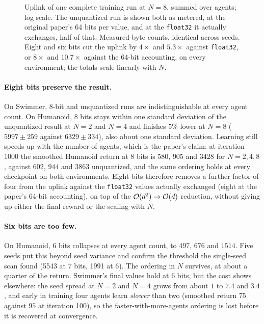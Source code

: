 \begin{figure}[tbp]
  \centering
  
  \caption{Uplink of one complete training run at $N=8$, summed over agents;
  log scale. The unquantized run is shown both as metered, at the original paper's 64
  bits per value, and at the \texttt{float32} it actually exchanges, half of
  that. Measured byte counts, identical across seeds. Eight and six bits cut
  the uplink by $4\times$ and $5.3\times$ against \texttt{float32}, or $8\times$
  and $10.7\times$ against the 64-bit accounting, on every environment; the
  totals scale linearly with $N$.}
  \label{fig:quantoverhead}
\end{figure}

\paragraph{Eight bits preserve the result.} On Swimmer, 8-bit and unquantized
runs are indistinguishable at every agent count. On Humanoid, 8 bits stays
within one standard deviation of the unquantized result at $N=2$ and $N=4$
and finishes $5\%$ lower at $N=8$ ($5997 \pm 259$ against $6329 \pm 334$),
also about one standard deviation. Learning still speeds up with the number of
agents, which is the paper's claim: at iteration 1000 the
smoothed Humanoid return at 8 bits is $580$, $905$ and $3428$ for $N = 2, 4,
8$, against $602$, $944$ and $3863$ unquantized, and the same ordering holds at
every checkpoint on both environments. Eight bits therefore removes a further
factor of four from the uplink against the \texttt{float32} values actually
exchanged (eight at the paper's 64-bit accounting), on top of the
$\mathcal{O}(d^2) \to \mathcal{O}(d)$ reduction, without giving up either the final reward or the scaling with $N$.

\paragraph{Six bits are too few.} On Humanoid, 6 bits collapses at every agent
count, to $497$, $676$ and $1514$. Five seeds put this beyond seed variance and
confirm the threshold the single-seed scan found (5543 at 7 bits, 1991 at
6). The ordering in $N$ survives, at about a quarter of the
return. Swimmer's final values hold at 6 bits, but the cost shows elsewhere:
the seed spread at $N=2$ and $N=4$ grows from about $1$ to $7.4$ and $3.4$,
and early in training four agents learn \emph{slower} than two (smoothed return
$75$ against $95$ at iteration 100), so the faster-with-more-agents ordering
is lost before it is recovered at convergence.

